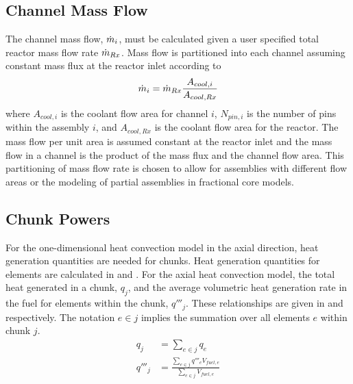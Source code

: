   \subsection{Channel Mass Flow}
    The channel mass flow, $\dot{m}_i$, must be calculated given a user 
    specified total reactor mass flow rate $\dot{m}_{Rx}$.  Mass flow is 
    partitioned into each channel assuming constant mass flux at the reactor 
    inlet according to 
    \begin{equation}
      \label{eq:mass_flow_split}
      \dot{m}_i = \dot{m}_{Rx} \frac{A_{cool,i}}{A_{cool,Rx}}
    \end{equation}
    where $A_{cool,i}$ is the coolant flow area for channel $i$, $N_{pin,i}$ is
    the number of pins within the assembly $i$, and $A_{cool,Rx}$
    is the coolant flow area for the reactor.  The mass flow per unit area is 
    assumed constant at the reactor inlet and the mass flow in a channel is the
    product of the mass flux and the channel flow area. This partitioning of
    mass flow rate is chosen to allow for assemblies with different flow areas
    or the modeling of partial assemblies in fractional core models.

  \subsection{Chunk Powers}
    For the one-dimensional heat convection model in the axial direction,
    heat generation quantities are needed for chunks. Heat generation quantities
    for elements are calculated in  and
    .
    For the axial heat convection model, the total heat generated in a chunk,
    $q_j$, and the average volumetric heat generation rate in the fuel for
    elements within the chunk, $q'''_j$. 
    These relationships are given in  and
     respectively. The notation $e \in j$ implies the
    summation over all elements $e$ within chunk $j$.
    \begin{align}
      \label{eq:chunkpwr}
      q_j &= \sum_{e \in j} q_e \\
      \label{eq:chunkqppp_fuel}
      q'''_j &= \frac{\sum_{e \in j} q'''_e V_{fuel,e}}{\sum_{e \in j} 
        V_{fuel,e}}
    \end{align}
  
